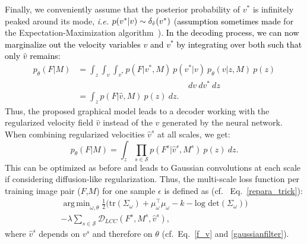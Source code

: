 \documentclass[journal]{IEEEtran}
\newcommand{\update}[1]{\textcolor{black}{#1}}
\DeclareMathOperator*{\argmin}{arg\,min}
\begin{document}
Finally, we conveniently assume that the posterior probability of $v^*$ is infinitely peaked around its mode, {\em i.e.} $p(v^*|\update{v}) \sim \delta_{\hat{v}} (v^*)$ (\update{assumption sometimes made} for the Expectation-Maximization algorithm~\cite{DBLP:journals/neco/KuriharaW09}). \update{In the decoding process, we can now marginalize out the velocity variables $v$ and $v^*$ by integrating over  both such that only $\hat{v}$ remains:}
\begin{align}\label{stochprocreg}
p_\theta(F|M) &= \int_z \int_v \int_{v^*} p(F|v^*,M)~p(v^*|v)~p_\theta(v|z,M)~p(z)\nonumber\\& \hspace{160pt} dv~ dv^*~dz \nonumber\\
&= \int_z  p(F|\hat{v},M)~p(z)~dz.
\end{align}
Thus, the proposed graphical model leads to a decoder working with the regularized velocity field $\hat{v}$ instead of the $v$ generated by the neural network. 
When combining regularized velocities $\hat{v}^s$ at all scales, we get: 
\begin{equation}
p_\theta(F|M) = \int_z \prod_{s \in \mathcal{S}} p(F^s|\hat{v}^{s},M^s)~p(z)~dz.
\end{equation}
This can be optimized as before and leads to Gaussian convolutions at each scale if considering diffusion-like regularization. Thus, the multi-scale loss function per training image pair ($F$,$M$) for one sample $\epsilon$ is defined as (cf.~ Eq.~\ref{repara_trick}):
\begin{multline}\label{final_loss}
 \argmin_{\omega,\theta} \frac{1}{2} \Big( \text{tr}(\Sigma_\omega) + \mu_\omega^\top \mu_\omega - k - \text{log det} (\Sigma_\omega) \Big) \\ - \lambda \sum_{s \in \mathcal{S}} \mathcal{D}_\textit{LCC}(F^s,M^s,\hat{v}^{s}),
\end{multline}
where $\hat{v}^s$ depends on $v^s$ and therefore on $\theta$ (cf.~Eq.~\ref{f_v} and \ref{gaussianfilter}).
\end{document}

